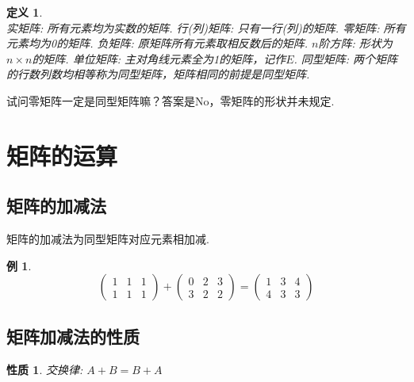 \documentclass[12pt, a4paper, oneside]{ctexbook}
\newtheorem{definition}[theorem]{定义}
\newtheorem{example}[theorem]{例}
\newtheorem{quolity}[theorem]{性质}
\begin{document}
\begin{definition}
    ~\\ %
    实矩阵: 所有元素均为实数的矩阵. 
    \newline
    行(列)矩阵: 只有一行(列)的矩阵. 
    \newline
    零矩阵: 所有元素均为0的矩阵. 
    \newline
    负矩阵: 原矩阵所有元素取相反数后的矩阵. 
    \newline
    $n$阶方阵: 形状为$n \times n$的矩阵. 
    \newline
    单位矩阵: 主对角线元素全为1的矩阵，记作$E$. 
    \newline
    同型矩阵: 两个矩阵的行数列数均相等称为同型矩阵，矩阵相同的前提是同型矩阵. 
\end{definition}

试问零矩阵一定是同型矩阵嘛？答案是No，零矩阵的形状并未规定. 


\section{矩阵的运算}

\subsection{矩阵的加减法}

矩阵的加减法为同型矩阵对应元素相加减.

\begin{example}
    $$\left ( \begin{matrix}
        1 & 1 & 1 \\
        1 & 1 & 1
    \end{matrix} \right ) + \left ( \begin{matrix}
        0 & 2 & 3 \\
        3 & 2 & 2
    \end{matrix} \right ) = \left ( \begin{matrix}
        1 & 3 & 4 \\
        4 & 3 & 3
    \end{matrix} \right )$$
\end{example}

\subsection{矩阵加减法的性质}

\begin{quolity}
    交换律: $A + B = B + A$
\end{quolity}
\end{document}
